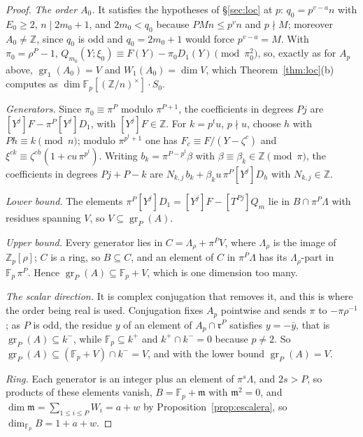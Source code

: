 \documentclass[11pt,a4paper]{article}
\theoremstyle{definition}
\newcommand{\ZZ}{\mathbb{Z}}
\newcommand{\FF}{\mathbb{F}}
\newcommand{\rad}{\mathfrak{r}}
\newcommand{\gr}{\operatorname{gr}}
\begin{document}
\begin{proof}
\emph{The order $A_0$.} It satisfies the hypotheses of \S\ref{sec:loc} at $p$: $q_0=p^{v-a}n$ with $E_0\ge2$, $n\mid2m_0+1$,
and $2m_0<q_0$ because $PMn\le p^vn$ and $p\nmid M$; moreover $A_0\ne\ZZ$, since $q_0$ is odd and
$q_0=2m_0+1$ would force $p^{v-a}=M$. With $\pi_0=\rho^P-1$, $Q_{m_0}(Y;\xi_0)\equiv F(Y)-\pi_0D_1(Y)
\pmod{\pi_0^2}$, so, exactly as for $A_p$ above, $\gr_1(A_0)=V$ and $W_1(A_0)=\dim V$, which Theorem~\ref{thm:loc}(b)
computes as $\dim\FF_p[(\ZZ/n)^\times]\cdot S_0$.

\emph{Generators.} Since $\pi_0\equiv\pi^P$ modulo $\pi^{P+1}$, the coefficients in degrees $Pj$ are
$[Y^j]F-\pi^P[Y^j]D_1$, with $[Y^j]F\in\ZZ$. For $k=p^tu$, $p\nmid u$, choose $h$ with $Ph\equiv k\pmod n$; modulo
$\pi^{p^t+1}$ one has $F_c\equiv F/(Y-\zeta^c)$ and $\xi^{ck}\equiv\zeta^{ch}(1+cu\,\pi^{p^t})$. Writing
$b_k=\pi^{P-p^t}\beta$ with $\beta\equiv\beta_k\in\ZZ\pmod\pi$, the coefficients in degrees $Pj+P-k$ are
$N_{k,j}\,b_k+\beta_ku\,\pi^P[Y^j]D_h$ with $N_{k,j}\in\ZZ$.

\emph{Lower bound.} The elements $\pi^P[Y^j]D_1=[Y^j]F-[T^{Pj}]Q_m$ lie in $B\cap\pi^P\Lambda$ with residues spanning
$V$, so $V\subseteq\gr_P(A)$.

\emph{Upper bound.} Every generator lies in $C=\Lambda_\rho+\pi^PV$, where $\Lambda_\rho$ is the image of
$\ZZ_p[\rho]$; $C$ is a ring, so $B\subseteq C$, and an element of $C$ in $\pi^P\Lambda$ has its $\Lambda_\rho$-part in
$\FF_p\,\pi^P$. Hence $\gr_P(A)\subseteq\FF_p+V$, which is one dimension too many.

\emph{The scalar direction.} It is complex conjugation that removes it, and this is where the order being real is
used. Conjugation fixes $A_p$ pointwise and sends $\pi$ to $-\pi\rho^{-1}$; as $P$ is odd, the residue $y$ of an
element of $A_p\cap\rad^P$ satisfies $y=-\bar y$, that is $\gr_P(A)\subseteq k^-$, while $\FF_p\subseteq k^+$ and
$k^+\cap k^-=0$ because $p\neq2$. So $\gr_P(A)\subseteq(\FF_p+V)\cap k^-=V$, and with the lower bound
$\gr_P(A)=V$.

\emph{Ring.} Each generator is an integer plus an element of $\pi^s\Lambda$, and $2s>P$, so products of these elements
vanish, $B=\FF_p+\mathfrak m$ with $\mathfrak m^2=0$, and $\dim\mathfrak m=\sum_{1\le i\le P}W_i=a+w$ by
Proposition~\ref{prop:escalera}, so $\dim_{\FF_p}B=1+a+w$.
\end{proof}
\end{document}
